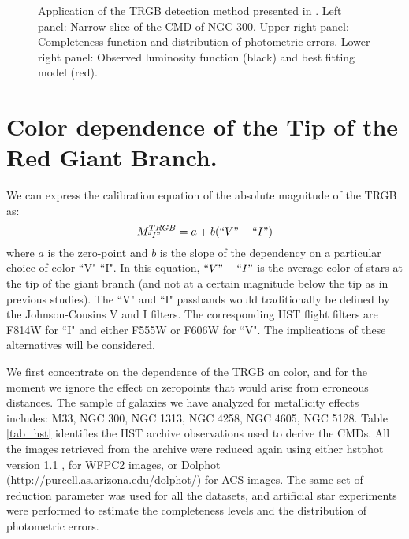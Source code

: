 \documentclass[11pt,preprint2]{aastex}
\begin{document}
\begin{figure}[htbp]
\caption{Application of the TRGB detection method presented in \cite{2006AJ....132.2729M}. Left panel: Narrow slice of the CMD of NGC 300. Upper right panel: Completeness function and distribution of photometric errors. Lower right panel: Observed luminosity function (black) and best fitting model (red).\label{fit}}
\end{figure}

\section{Color dependence of the Tip of the Red Giant Branch.}
\label{cmds_coldep}
We can express the calibration equation of the absolute magnitude of the TRGB as:
$$M_{``I"}^{TRGB}= a + b (``V"-``I")$$ where $a$ is the zero-point and $b$ is the slope of the dependency on a particular choice of color ``V"-``I". In this equation, $``V"-``I"$ is the average color of stars at the tip of the giant branch (and not at a certain magnitude below the tip as in previous studies). 
The ``V" and ``I" passbands would traditionally be defined by the Johnson-Cousins V and I filters. The corresponding HST flight filters are F814W for ``I" and either F555W or F606W for ``V". The implications of these alternatives will be considered.

We first concentrate on the dependence of the TRGB on color, and for the moment we ignore the effect on zeropoints  that would arise from erroneous distances.
The sample of galaxies we have analyzed for metallicity effects includes: M33, NGC 300, NGC 1313, NGC 4258, NGC 4605, NGC 5128. Table \ref{tab_hst} identifies the HST archive observations used to derive the CMDs. All the images retrieved from the archive were reduced again using either {\sc hstphot} version 1.1 \citep{2000PASP..112.1383D}, for WFPC2 images, or Dolphot (http://purcell.as.arizona.edu/dolphot/) for ACS images. The same set of reduction parameter was used for all the datasets, and artificial star experiments were performed to estimate the completeness levels and the distribution of photometric errors. 
\end{document}
